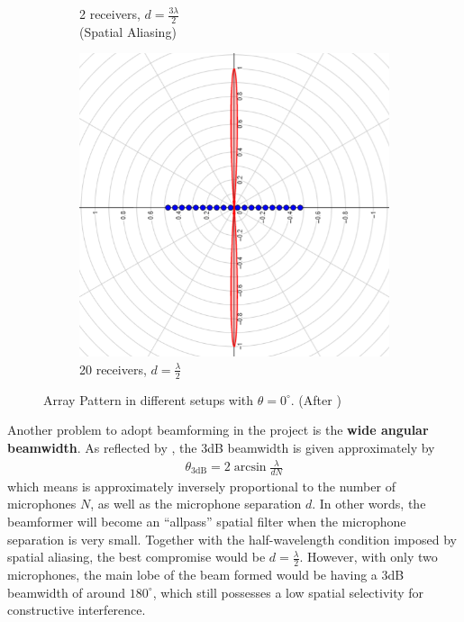\documentclass[a4paper,twoside,12pt,hidelinks]{article}
\begin{document}
\begin{figure}[H]
\begin{subfigure}[H]{0.3\textwidth}
\caption{2 receivers, $d =\frac{3\lambda}{2}$ \\(Spatial Aliasing)}
\end{subfigure}
\begin{subfigure}[H]{0.3\textwidth}
\includegraphics[width=\textwidth]{beamforminglargeN}
\caption{20 receivers, $d =\frac{\lambda}{2}$}
\end{subfigure}
\caption{Array Pattern in different setups with $\theta=0^\circ$. (After \cite{GuidoDietlBeamformingArray})}
\label{fig:beamforming}
\end{figure}

Another problem to adopt beamforming in the project is the \textbf{wide angular beamwidth}. As reflected by \cite{Rabinovich2013TypicalMethods}, the 3dB beamwidth is given approximately by 
\begin{align}
\theta_{\text{3dB}} = 2\arcsin\frac{\lambda}{dN} \label{eq:beamwidth}
\end{align}
which means is approximately inversely proportional to the number of microphones $N$, as well as the microphone separation $d$. In other words, the beamformer will become an ``allpass'' spatial filter when the microphone separation is very small. Together with the half-wavelength condition imposed by spatial aliasing, the best compromise would be $d=\frac{\lambda}{2}$. However, with only two microphones, the main lobe of the beam formed would be having a 3dB beamwidth of around $180^\circ$, which still possesses a low spatial selectivity for constructive interference.  
\end{document}
